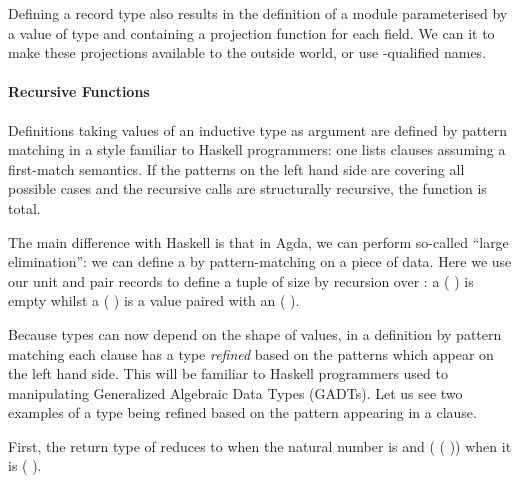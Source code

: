 \begin{minipage}{0.5\textwidth}
\end{minipage}
\begin{minipage}{0.5\textwidth}
\end{minipage}

Defining a record type  also results in the definition of a module 
parameterised by a value of type  and containing a projection function
for each field. We can  it to make these projections available to the
outside world, or use -qualified names.

\paragraph{Recursive Functions}

Definitions taking values of an inductive type as argument are defined by
pattern matching in a style familiar to Haskell programmers: one lists
clauses assuming a first-match semantics. If the patterns on the left hand
side are covering all possible cases and the recursive calls are structurally
recursive, the function is total.

The main difference with Haskell is that in Agda, we can perform so-called
``large elimination'': we can define a  by pattern-matching on a
piece of data. Here we use our unit and pair records to define a tuple of
size  by recursion over : a ( ) is empty
whilst a ( ) is a value paired with an ( ).


Because types can now depend on the shape of values, in a definition by pattern
matching each clause has a type \emph{refined} based on the patterns which appear
on the left hand side. This will be familiar to Haskell programmers used to
manipulating Generalized Algebraic Data Types (GADTs). Let us see two examples of
a type being refined based on the pattern appearing in a clause.

First, the return type of  reduces to  when the natural
number is  and (  (  )) when it is
( ).


